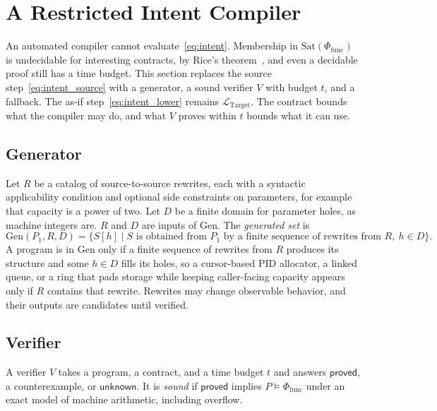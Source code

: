 \section{A Restricted Intent Compiler}
\label{sec:compiler}

An automated compiler cannot evaluate~\eqref{eq:intent}. Membership in
\(\mathrm{Sat}(\Phi_{\text{func}})\) is undecidable for interesting
contracts, by Rice's theorem~\cite{rice1953classes}, and even a decidable
proof still has a time budget. This section replaces the source
step~\eqref{eq:intent_source} with a generator, a sound verifier \(V\) with
budget \(t\), and a fallback. The as-if step~\eqref{eq:intent_lower} remains
\(\mathcal{L}_{\text{Target}}\). The contract bounds what the compiler may
do, and what \(V\) proves within \(t\) bounds what it can use.

\subsection{Generator}
\label{sec:generator}

Let \(R\) be a catalog of source-to-source rewrites, each with a syntactic
applicability condition and optional side constraints on parameters, for
example that capacity is a power of two. Let \(D\) be a finite domain for
parameter holes, as machine integers are. \(R\) and \(D\) are inputs of
\(\mathrm{Gen}\). The \emph{generated set} is
\[
\mathrm{Gen}(P_1, R, D)
= \{ S[h] \mid S \text{ is obtained from \(P_1\) by a finite sequence of
rewrites from \(R\)},\ h \in D \}.
\]
A program is in \(\mathrm{Gen}\) only if a finite sequence of rewrites from
\(R\) produces its structure and some \(h \in D\) fills its holes, so a
cursor-based PID allocator, a linked queue, or a ring that pads storage
while keeping caller-facing capacity appears only if \(R\) contains that
rewrite. Rewrites may change observable behavior, and their outputs are
candidates until verified.

\subsection{Verifier}
\label{sec:verifier}

A verifier \(V\) takes a program, a contract, and a time budget \(t\) and
answers \(\mathsf{proved}\), a counterexample, or \(\mathsf{unknown}\). It
is \emph{sound} if \(\mathsf{proved}\) implies
\(P \models \Phi_{\text{func}}\) under an exact model of machine arithmetic,
including overflow.

